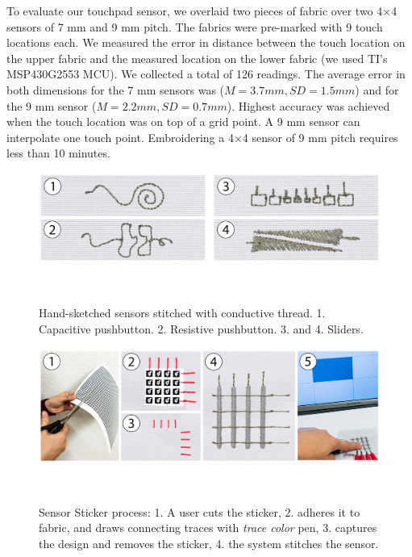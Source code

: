 \documentclass[header.tex]{subfiles}
\begin{document}
To evaluate our touchpad sensor, we overlaid two pieces of fabric over two 4$\times$4 sensors of 7 mm and 9 mm pitch. The fabrics were pre-marked with 9 touch locations each. We measured the error in distance between the touch location on the upper fabric and the measured location on the lower fabric (we used TI's MSP430G2553 MCU). We collected a total of 126 readings. The average error in both dimensions for the 7 mm sensors was ($M = 3.7 mm , SD = 1.5 mm$) and for the 9 mm sensor ($M = 2.2 mm, SD = 0.7 mm$).  Highest accuracy was achieved when the touch location was on top of a grid point. A 9 mm sensor can interpolate one touch point. Embroidering a 4$\times$4 sensor of 9 mm pitch requires less than 10 minutes.

\begin{figure}[t]
\centering
  \includegraphics[width=1\columnwidth]{figures/PushButtons_Sliders.png}
  \caption{Hand-sketched sensors stitched with conductive thread. 1. Capacitive pushbutton. 2. Resistive pushbutton. 3. and 4. Sliders.}~\label{fig:PushButtons_Sliders}
  \vspace{-2.2em}
\end{figure}

\begin{figure}[h]
\centering
  \includegraphics[width=1.0\columnwidth]{figures/Touchpad.png}
  \caption{Sensor Sticker process: 1. A user cuts the sticker, 2. adheres it to fabric, and draws connecting traces with \textit{trace color} pen, 3. captures the design and removes the sticker, 4. the system stitches the sensor.}~\label{fig:Touchpad}
  \vspace{-1.8em}
  \end{figure}
\end{document}
